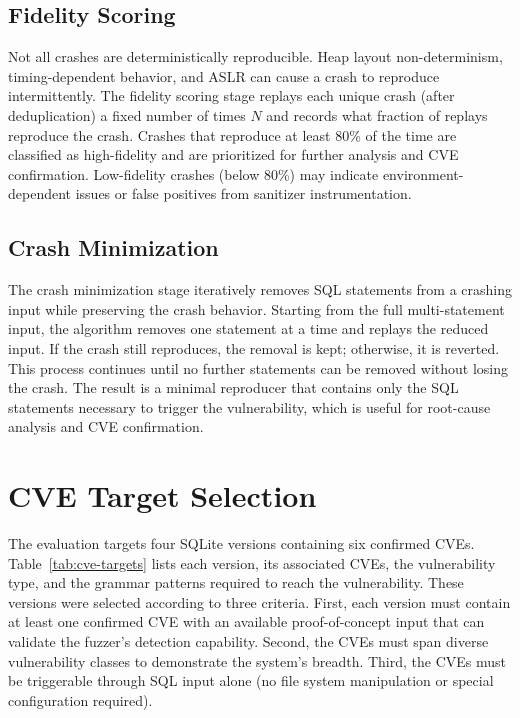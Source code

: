\subsection{Fidelity Scoring}

Not all crashes are deterministically reproducible. Heap layout non-determinism, timing-dependent behavior, and ASLR can cause a crash to reproduce intermittently. The fidelity scoring stage replays each unique crash (after deduplication) a fixed number of times $N$ and records what fraction of replays reproduce the crash. Crashes that reproduce at least 80\% of the time are classified as high-fidelity and are prioritized for further analysis and CVE confirmation. Low-fidelity crashes (below 80\%) may indicate environment-dependent issues or false positives from sanitizer instrumentation.

\subsection{Crash Minimization}

The crash minimization stage iteratively removes SQL statements from a crashing input while preserving the crash behavior. Starting from the full multi-statement input, the algorithm removes one statement at a time and replays the reduced input. If the crash still reproduces, the removal is kept; otherwise, it is reverted. This process continues until no further statements can be removed without losing the crash. The result is a minimal reproducer that contains only the SQL statements necessary to trigger the vulnerability, which is useful for root-cause analysis and CVE confirmation.

\section{CVE Target Selection}
\label{sec:cve-targets}

The evaluation targets four SQLite versions containing six confirmed CVEs. Table~\ref{tab:cve-targets} lists each version, its associated CVEs, the vulnerability type, and the grammar patterns required to reach the vulnerability. These versions were selected according to three criteria. First, each version must contain at least one confirmed CVE with an available proof-of-concept input that can validate the fuzzer's detection capability. Second, the CVEs must span diverse vulnerability classes to demonstrate the system's breadth. Third, the CVEs must be triggerable through SQL input alone (no file system manipulation or special configuration required).

